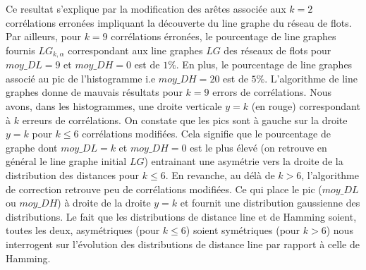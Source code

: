 \documentclass[onecolumn, 12pt]{book}
\begin{document}
Ce resultat s'explique par la modification des ar\^etes associ\'ee aux $k = 2$ corr\'elations erron\'ees impliquant la d\'ecouverte du line graphe du r\'eseau de flots.
Par ailleurs, pour $k = 9$ corr\'elations \'erron\'ees, le pourcentage de line graphes fournis $LG_{k,\alpha}$ correspondant aux line graphes $LG$ des r\'eseaux de flots pour $moy\_DL = 9$ et $moy\_DH=0$ est de $1\%$. 
En plus, le pourcentage de line graphes associ\'e au pic de l'histogramme i.e $moy\_DH = 20$ est de $5\%$.
L'algorithme de line graphes donne de mauvais r\'esultats pour $k=9$ errors de corr\'elations.
\newline
Nous avons, dans les histogrammes, une droite verticale $y = k$ (en rouge) correspondant \`a $k$ erreurs de corr\'elations.
On constate que les pics sont \`a gauche sur la droite $y = k$ pour $k \le 6$ corr\'elations modifi\'ees.
Cela signifie que le pourcentage de graphe dont $moy\_DL = k$  et $moy\_DH=0$ est le plus \'elev\'e (on retrouve en g\'en\'eral le line graphe initial $LG$) entrainant une asym\'etrie vers la droite de la distribution des distances pour $k \le 6$.
En revanche, au d\'el\`a de $k>6$, l'algorithme de correction retrouve peu de corr\'elations modifi\'ees. Ce qui place le pic ($moy\_DL$ ou $moy\_DH$) \`a droite de la droite $y = k$ et fournit une distribution gaussienne des distributions. \newline
Le fait que les distributions de distance line et de Hamming soient, toutes les deux, asym\'etriques (pour $k \le 6$) soient sym\'etriques (pour $k>6$) nous interrogent sur l'\'evolution des distributions de distance line par rapport \`a celle de Hamming. 
\newline
\end{document}
